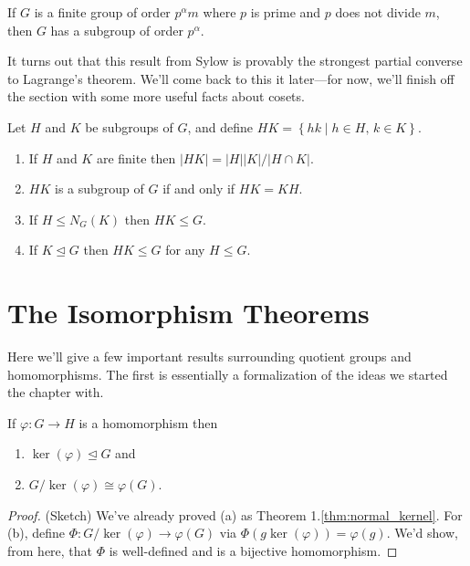\documentclass[../m171main.tex]{subfiles}
\begin{document}
\begin{theorem}
    If $G$ is a finite group of order $p^{\alpha} m$ where $p$ is prime and $p$ does not divide $m$,    %
    then $G$ has a subgroup of order $p^{\alpha}$.
\end{theorem}

It turns out that this result from Sylow is provably the strongest partial converse to Lagrange's theorem.
We'll come back to this it later---for now, we'll finish off the section with some more useful facts about cosets.

\begin{theorem}[]
    Let $H$ and $K$ be subgroups of $G$, and define $HK = \left\{ hk \mid h \in H, \, k \in K \right\}$.
    \begin{enumerate}[label=(\alph*)]
        \item If $H$ and $K$ are finite then $|HK| = |H| |K| / |H \cap K|$.
        \item $HK$ is a subgroup of $G$ if and only if $HK = KH$.
        \item If $H \leq N_G(K)$ then $HK \leq G$.
        \item If $K \trianglelefteq G$ then $HK \leq G$ for any $H \leq G$.
    \end{enumerate}
\end{theorem}

\section{The Isomorphism Theorems}
Here we'll give a few important results surrounding quotient groups and homomorphisms.
The first is essentially a formalization of the ideas we started the chapter with.

\begin{theorem}
    If $\varphi : G \to H$ is a homomorphism then
    \begin{enumerate}[label=(\alph*)]
        \item $\ker(\varphi) \trianglelefteq G$ and
        \item $G / \ker(\varphi) \cong \varphi(G)$.
    \end{enumerate}
\end{theorem}

\begin{proof}
    (Sketch)
    We've already proved (a) as Theorem 1.\ref{thm:normal_kernel}.
    For (b), define $\Phi : G / \ker (\varphi) \to \varphi(G)$ via $\Phi(g \ker (\varphi)) = \varphi(g)$.
    We'd show, from here, that $\Phi$ is well-defined and is a bijective homomorphism.
\end{proof}
\end{document}

